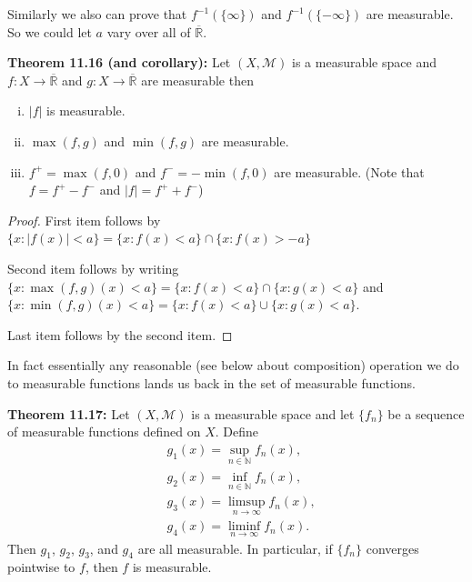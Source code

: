 \documentclass[12pt]{book}
\newcommand{\abs}[1]{\left\lvert {#1} \right\rvert}
\newcommand{\R}{{\mathbb{R}}}
\newcommand{\N}{{\mathbb{N}}}
\newcommand{\sM}{{\mathcal{M}}}
\theoremstyle{plain}
\theoremstyle{remark}
\theoremstyle{definition}
\theoremstyle{exercise}
\theoremstyle{example}
\begin{document}
\medskip

Similarly we also can prove that $f^{-1} (\{\infty\})$ and
$f^{-1}(\{-\infty\})$ are measurable.  So we could let $a$ vary over all of
$\overline{\R}$.

\medskip

\textbf{Theorem 11.16 (and corollary):}
Let $(X,\sM)$ is a measurable space and $f \colon X \to \overline{\R}$
and $g \colon X \to \overline{\R}$ are measurable then
\begin{enumerate}[(i)]
\item $\abs{f}$ is measurable.
\item $\max(f,g)$ and $\min(f,g)$ are measurable.
\item $f^+ = \max(f,0)$ and $f^-=-\min(f,0)$ are measurable.  (Note that
$f = f^+ - f^-$ and $\abs{f} = f^+ + f^-$)
\end{enumerate}

\begin{proof}
First item follows by
$
\{ x : \abs{f(x)} < a \} = \{ x : f(x) < a \} \cap \{ x : f(x) > -a \}
$

Second item follows by writing
$
\{ x : \max(f,g) (x) < a \} = \{ x : f(x) < a \} \cap \{ x : g(x) < a \}
$
and
$
\{ x : \min(f,g) (x) < a \} = \{ x : f(x) < a \} \cup \{ x : g(x) < a \}
$.

Last item follows by the second item.
\end{proof}

\medskip

In fact essentially any reasonable (see below about composition) operation we do to measurable functions
lands us back in the set of measurable functions.

\medskip

\textbf{Theorem 11.17:}
Let $(X,\sM)$ is a measurable space and
let $\{ f_n \}$ be a sequence of measurable functions defined on $X$.  
Define
\begin{align*}
& g_1(x) = \sup_{n \in \N} f_n(x) , \\
& g_2(x) = \inf_{n \in \N} f_n(x) , \\
& g_3(x) = \limsup_{n \to \infty} f_n(x) , \\
& g_4(x) = \liminf_{n\to\infty} f_n(x) .
\end{align*}
Then $g_1$, $g_2$, $g_3$, and $g_4$ are all measurable.   In particular, if
$\{f_n\}$ converges pointwise to $f$, then $f$ is measurable.

\medskip
\end{document}
